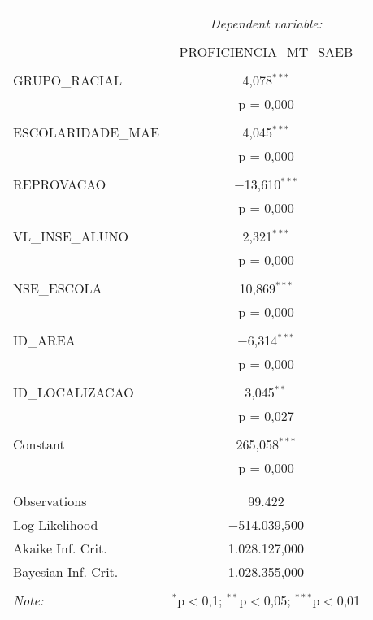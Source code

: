 \begin{table}[!htbp] \centering 
  \caption{} 
  \label{} 
\begin{tabular}{@{\extracolsep{5pt}}lc} 
\\[-1.8ex]\hline 
\hline \\[-1.8ex] 
 & \multicolumn{1}{c}{\textit{Dependent variable:}} \\ 
\cline{2-2} 
\\[-1.8ex] & PROFICIENCIA\_MT\_SAEB \\ 
\hline \\[-1.8ex] 
 GRUPO\_RACIAL & 4,078$^{***}$ \\ 
  & p = 0,000 \\ 
  & \\ 
 ESCOLARIDADE\_MAE & 4,045$^{***}$ \\ 
  & p = 0,000 \\ 
  & \\ 
 REPROVACAO & $-$13,610$^{***}$ \\ 
  & p = 0,000 \\ 
  & \\ 
 VL\_INSE\_ALUNO & 2,321$^{***}$ \\ 
  & p = 0,000 \\ 
  & \\ 
 NSE\_ESCOLA & 10,869$^{***}$ \\ 
  & p = 0,000 \\ 
  & \\ 
 ID\_AREA & $-$6,314$^{***}$ \\ 
  & p = 0,000 \\ 
  & \\ 
 ID\_LOCALIZACAO & 3,045$^{**}$ \\ 
  & p = 0,027 \\ 
  & \\ 
 Constant & 265,058$^{***}$ \\ 
  & p = 0,000 \\ 
  & \\ 
\hline \\[-1.8ex] 
Observations & 99.422 \\ 
Log Likelihood & $-$514.039,500 \\ 
Akaike Inf. Crit. & 1.028.127,000 \\ 
Bayesian Inf. Crit. & 1.028.355,000 \\ 
\hline 
\hline \\[-1.8ex] 
\textit{Note:}  & \multicolumn{1}{r}{$^{*}$p$<$0,1; $^{**}$p$<$0,05; $^{***}$p$<$0,01} \\ 
\end{tabular} 
\end{table} 

